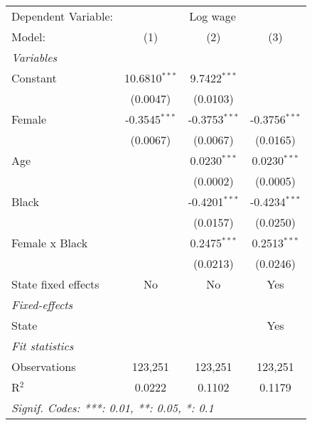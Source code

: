 
\begingroup
\centering
\begin{tabular}{lccc}
   \tabularnewline \midrule \midrule
   Dependent Variable: & \multicolumn{3}{c}{Log wage}\\
   Model:              & (1)             & (2)             & (3)\\  
   \midrule
   \emph{Variables}\\
   Constant            & 10.6810$^{***}$ & 9.7422$^{***}$  &   \\   
                       & (0.0047)        & (0.0103)        &   \\   
   Female              & -0.3545$^{***}$ & -0.3753$^{***}$ & -0.3756$^{***}$\\   
                       & (0.0067)        & (0.0067)        & (0.0165)\\   
   Age                 &                 & 0.0230$^{***}$  & 0.0230$^{***}$\\   
                       &                 & (0.0002)        & (0.0005)\\   
   Black               &                 & -0.4201$^{***}$ & -0.4234$^{***}$\\   
                       &                 & (0.0157)        & (0.0250)\\   
   Female x Black      &                 & 0.2475$^{***}$  & 0.2513$^{***}$\\   
                       &                 & (0.0213)        & (0.0246)\\   
   State fixed effects & No              & No              & Yes\\  
   \midrule
   \emph{Fixed-effects}\\
   State               &                 &                 & Yes\\  
   \midrule
   \emph{Fit statistics}\\
   Observations        & 123,251         & 123,251         & 123,251\\  
   R$^2$               & 0.0222          & 0.1102          & 0.1179\\  
   \midrule \midrule
   \multicolumn{4}{l}{\emph{Signif. Codes: ***: 0.01, **: 0.05, *: 0.1}}\\
\end{tabular}
\par\endgroup



